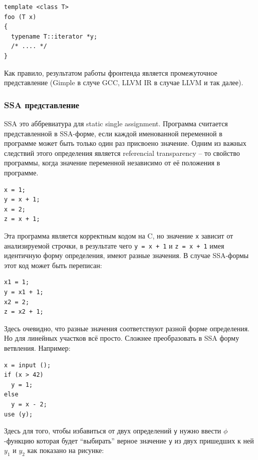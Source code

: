 \documentclass[a4paper,12pt,oneside]{article}
\begin{document}
\begin{lstlisting}
template <class T>
foo (T x)
{
  typename T::iterator *y;
  /* .... */
}
\end{lstlisting}

Как правило, результатом работы фронтенда является промежуточное представление (Gimple в случе GCC, LLVM IR в случае LLVM и так далее).

\subsubsection{SSA представление}\label{subsubsec:SSA}

SSA это аббревиатура для static single assignment. Программа считается представленной в SSA-форме, если каждой именованной переменной в программе может быть только один раз присвоено значение. Одним из важных следствий этого определения является referencial transparency -- то свойство программы, когда значение переменной независимо от её положения в программе.

\begin{lstlisting}
x = 1;
y = x + 1;
x = 2;
z = x + 1;
\end{lstlisting}

Эта программа является корректным кодом на C, но значение \lstinline!x! зависит от анализируемой строчки, в результате чего \lstinline!y = x + 1! и \lstinline!z = x + 1! имея идентичную форму определения, имеют разные значения. В случае SSA-формы этот код может быть переписан:

\begin{lstlisting}
x1 = 1;
y = x1 + 1;
x2 = 2;
z = x2 + 1;
\end{lstlisting}

Здесь очевидно, что разные значения соответствуют разной форме определения. Но для линейных участков всё просто. Сложнее преобразовать в SSA форму ветвления. Например:

\begin{lstlisting}
x = input ();
if (x > 42)
  y = 1;
else
  y = x - 2;
use (y);
\end{lstlisting}

Здесь для того, чтобы избавиться от двух определений \lstinline!y! нужно ввести $\phi$-функцию которая будет ``выбирать'' верное значение \lstinline!y! из двух пришедших к ней $y_1$ и $y_2$ как показано на рисунке:
\end{document}
